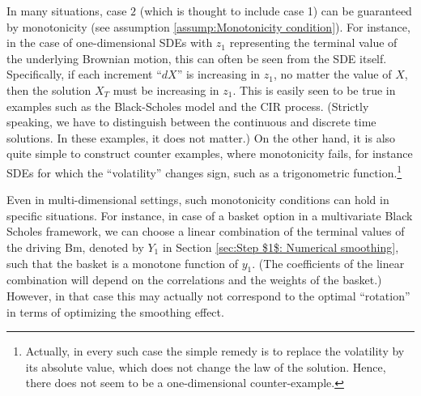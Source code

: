In many situations, case $2$ (which is thought to include case 1) can be
guaranteed by monotonicity (see assumption  \eqref{assump:Monotonicity condition}). For instance, in the case of one-dimensional SDEs
with $z_1$ representing the terminal value of the underlying Brownian motion, this can often be seen from the SDE itself. Specifically, if each increment ``$dX$'' is increasing in $z_1$, no matter the value of $X$, then the solution $X_T$ must be increasing
in $z_1$. This is easily seen to be true in examples such as the Black-Scholes model and the CIR process. (Strictly speaking, we have to distinguish between the continuous and discrete time solutions. In these examples, it does not matter.) On the other hand, it is also quite simple to construct counter examples, where monotonicity fails, for instance SDEs for which the ``volatility'' changes sign, such as a trigonometric function.\footnote{Actually, in every such case the simple remedy is to replace the volatility by its absolute value, which does not change the law of the solution. Hence, there does not seem to be a one-dimensional counter-example.}

Even in multi-dimensional settings, such monotonicity conditions can hold in specific situations. For instance, in case of a basket option in a multivariate Black Scholes framework, we can choose a linear combination of the terminal values of the driving Bm, denoted by $Y_1$ in Section \ref{sec:Step $1$: Numerical smoothing}, such that the basket is a monotone function of $y_1$. (The coefficients of the linear combination will depend on the correlations and the weights of the basket.) However, in that case this may actually not correspond to the optimal ``rotation'' in terms of optimizing the smoothing effect.

